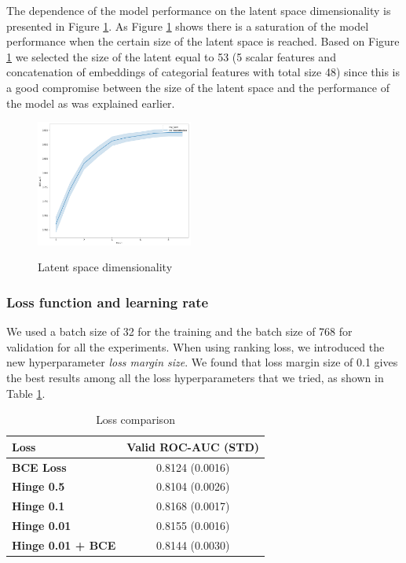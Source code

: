 \documentclass[sigconf]{acmart}
\begin{document}
The dependence of the model performance on the latent space dimensionality is presented in Figure \ref{fig-lat}. As Figure \ref{fig-lat} shows there is a saturation of the model performance when the certain size of the latent space is reached. Based on Figure \ref{tab-loss} we selected the size of the latent equal to 53 (5 scalar features and concatenation of embeddings of categorial features with total size 48) since this is a good compromise between the size of the latent space and the performance of the model as was explained earlier.

\begin{figure}[ht]
  \caption{Latent space dimensionality}
  \includegraphics[width=0.46\textwidth]{figures/latent-pic.png}
  \label{fig-lat}
\end{figure}

\subsubsection{Loss function and learning rate}

We used a batch size of 32 for the training and the batch size of 768 for validation for all the experiments. When using ranking loss, we introduced the new hyperparameter \textit{loss margin size}. We found that loss margin size of 0.1 gives the best results among all the loss hyperparameters that we tried, as shown in Table \ref{tab-loss}. 

\begin{table}[ht]
\caption{Loss comparison}
\begin{tabular}{ | l | c |  }
\hline
\textbf{Loss} & \textbf{Valid ROC-AUC (STD)} \\
\hline
\textbf{BCE Loss} & 0.8124 (0.0016)  \\
\textbf{Hinge 0.5} & 0.8104 (0.0026)  \\
\textbf{Hinge 0.1} & 0.8168 (0.0017)  \\
\textbf{Hinge 0.01} & 0.8155 (0.0016)  \\
\textbf{Hinge 0.01 + BCE} & 0.8144 (0.0030)  \\
\hline
\end{tabular}
\label{tab-loss}
\end{table}
\end{document}
